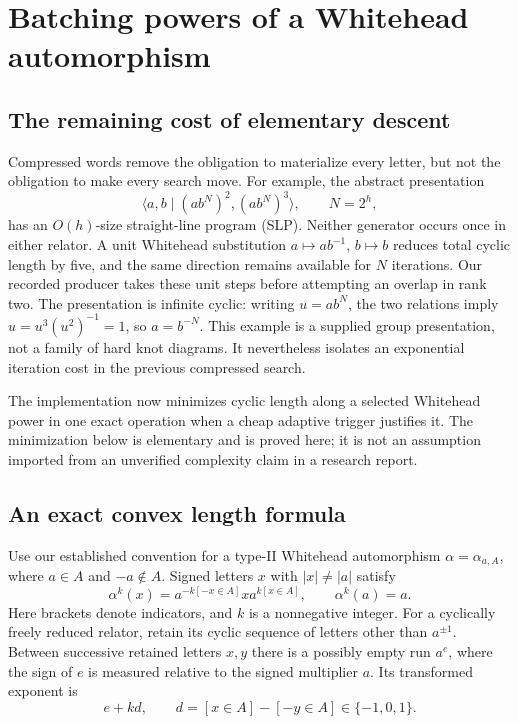 \section{Batching powers of a Whitehead automorphism}
\label{sec:whitehead-powers}

\subsection{The remaining cost of elementary descent}

Compressed words remove the obligation to materialize every letter, but
not the obligation to make every search move. For example, the abstract
presentation
\[
 \langle a,b\mid (ab^N)^2,(ab^N)^3\rangle,\qquad N=2^h,
\]
has an $O(h)$-size straight-line program (SLP). Neither generator occurs
once in either relator. A unit Whitehead substitution $a\mapsto ab^{-1}$,
$b\mapsto b$ reduces total cyclic length by five, and the same direction
remains available for $N$ iterations. Our recorded producer takes these
unit steps before attempting an overlap in rank two. The presentation is
infinite cyclic: writing $u=ab^N$, the two relations imply $u=u^3(u^2)^{-1}=1$,
so $a=b^{-N}$. This example is a supplied group presentation, not a family
of hard knot diagrams. It nevertheless isolates an exponential iteration
cost in the previous compressed search.

The implementation now minimizes cyclic length along a selected Whitehead
power in one exact operation when a cheap adaptive trigger justifies it.
The minimization below is elementary and is proved here; it is not an
assumption imported from an unverified complexity claim in a research report.

\subsection{An exact convex length formula}

Use our established convention for a type-II Whitehead automorphism
$\alpha=\alpha_{a,A}$, where $a\in A$ and $-a\notin A$. Signed letters
$x$ with $|x|\ne |a|$ satisfy
\[
 \alpha^k(x)=a^{-k[-x\in A]}x a^{k[x\in A]},
 \qquad \alpha^k(a)=a.
\]
Here brackets denote indicators, and $k$ is a nonnegative integer.
For a cyclically freely reduced relator, retain its cyclic sequence of
letters other than $a^{\pm1}$. Between successive retained letters $x,y$
there is a possibly empty run $a^e$, where the sign of $e$ is measured
relative to the signed multiplier $a$. Its transformed exponent is
\[
 e+kd,\qquad d=[x\in A]-[-y\in A]\in\{-1,0,1\}.
\]

